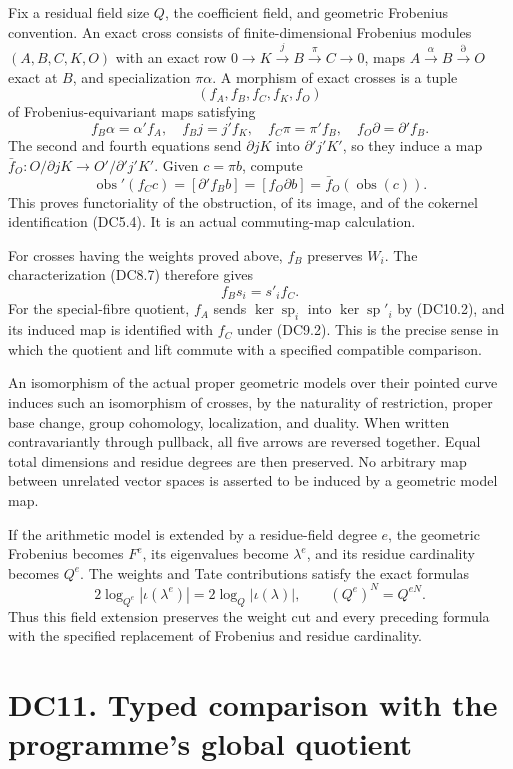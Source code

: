 \documentclass[
]{report}
\begin{document}
Fix a residual field size \(Q\), the coefficient field, and geometric
Frobenius convention. An exact cross consists of finite-dimensional
Frobenius modules \((A,B,C,K,O)\) with an exact row
\(0\to K\xrightarrow{j}B\xrightarrow{\pi}C\to0\), maps
\(A\xrightarrow{\alpha}B\xrightarrow{\partial}O\) exact at \(B\), and
specialization \(\pi\alpha\). A morphism of exact crosses is a tuple \[
(f_A,f_B,f_C,f_K,f_O)
\tag{DC10.1}
\] of Frobenius-equivariant maps satisfying \[
f_B\alpha=\alpha'f_A,\quad
f_Bj=j'f_K,\quad
f_C\pi=\pi'f_B,\quad
f_O\partial=\partial'f_B.
\tag{DC10.2}
\] The second and fourth equations send \(\partial jK\) into
\(\partial'j'K'\), so they induce a map
\(\bar f_O:O/\partial jK\to O'/\partial'j'K'\). Given \(c=\pi b\),
compute \[
\operatorname{obs}'(f_Cc)
 =[\partial'f_Bb]=[f_O\partial b]
 =\bar f_O(\operatorname{obs}(c)).
\tag{DC10.3}
\] This proves functoriality of the obstruction, of its image, and of
the cokernel identification (DC5.4). It is an actual commuting-map
calculation.

For crosses having the weights proved above, \(f_B\) preserves \(W_i\).
The characterization (DC8.7) therefore gives \[
f_Bs_i=s'_if_C.
\tag{DC10.4}
\] For the special-fibre quotient, \(f_A\) sends
\(\ker\operatorname{sp}_i\) into \(\ker\operatorname{sp}'_i\) by
(DC10.2), and its induced map is identified with \(f_C\) under (DC9.2).
This is the precise sense in which the quotient and lift commute with a
specified compatible comparison.

An isomorphism of the actual proper geometric models over their pointed
curve induces such an isomorphism of crosses, by the naturality of
restriction, proper base change, group cohomology, localization, and
duality. When written contravariantly through pullback, all five arrows
are reversed together. Equal total dimensions and residue degrees are
then preserved. No arbitrary map between unrelated vector spaces is
asserted to be induced by a geometric model map.

If the arithmetic model is extended by a residue-field degree \(e\), the
geometric Frobenius becomes \(F^e\), its eigenvalues become
\(\lambda^e\), and its residue cardinality becomes \(Q^e\). The weights
and Tate contributions satisfy the exact formulas \[
2\log_{Q^e}|\iota(\lambda^e)|=2\log_Q|\iota(\lambda)|,
\qquad (Q^e)^N=Q^{eN}.
\tag{DC10.5}
\] Thus this field extension preserves the weight cut and every
preceding formula with the specified replacement of Frobenius and
residue cardinality.

\section{DC11. Typed comparison with the programme's global
quotient}\label{dc11.-typed-comparison-with-the-programmes-global-quotient}
\end{document}
